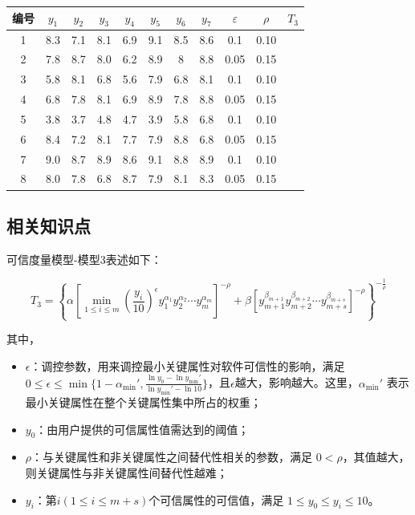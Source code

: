\documentclass{article}
\begin{document}
\begin{center}
	\begin{tabular}{|c|c|c|c|c|c|c|c|c|c|c|}
		\hline
		编号 & $y_1$ & $y_2$ & $y_3$ & $y_4$ & $y_5$ & $y_6$ & $y_7$ & $\varepsilon$ & $\rho$ & $T_3$ \\ \hline
		1   & 8.3   & 7.1   & 8.1   & 6.9   & 9.1   & 8.5   & 8.6   & 0.1           & 0.10   &       \\ \hline
		2   & 7.8   & 8.7   & 8.0   & 6.2   & 8.9   & 8     & 8.8   & 0.05          & 0.15   &       \\ \hline
		3   & 5.8   & 8.1   & 6.8   & 5.6   & 7.9   & 6.8   & 8.1   & 0.1           & 0.10   &       \\ \hline
		4   & 6.8   & 7.8   & 8.1   & 6.9   & 8.9   & 7.8   & 8.8   & 0.05          & 0.15   &       \\ \hline
		5   & 3.8   & 3.7   & 4.8   & 4.7   & 3.9   & 5.8   & 6.8   & 0.1           & 0.10   &       \\ \hline
		6   & 8.4   & 7.2   & 8.1   & 7.7   & 7.9   & 8.8   & 6.8   & 0.05          & 0.15   &       \\ \hline
		7   & 9.0   & 8.7   & 8.9   & 8.6   & 9.1   & 8.8   & 8.9   & 0.1           & 0.10   &       \\ \hline
		8   & 8.0   & 7.8   & 6.8   & 8.7   & 7.9   & 8.1   & 8.3   & 0.05          & 0.15   &       \\ \hline
	\end{tabular}
\end{center}

\subsection{相关知识点}

可信度量模型-模型3表述如下：

$$
T_3 = \left\{ \alpha \left[ \min_{1 \leq i \leq m} \left( \frac{y_i}{10} \right)^\epsilon y_1^{\alpha_1} y_2^{\alpha_2} \cdots y_m^{\alpha_m} \right]^{-\rho} + \beta \left[ y_{m+1}^{\beta_{m+1}} y_{m+2}^{\beta_{m+2}} \cdots y_{m+s}^{\beta_{m+s}} \right]^{-\rho} \right\}^{-\frac{1}{\rho}}
$$

其中，

\begin{itemize}
	\item $\epsilon$：调控参数，用来调控最小关键属性对软件可信性的影响，满足 $0 \leq \epsilon \leq \min\{1 - \alpha_{\text{min}}', \frac{\ln y_0 - \ln y_{\text{min}}'}{\ln y_{\text{min}}' - \ln 10}\}$，且$\epsilon$越大，影响越大。这里，$\alpha_{\text{min}}'$ 表示最小关键属性在整个关键属性集中所占的权重；
	\item $y_0$：由用户提供的可信属性值需达到的阈值；
	\item $\rho$：与关键属性和非关键属性之间替代性相关的参数，满足 $0 < \rho$，其值越大，则关键属性与非关键属性间替代性越难；
	\item $y_i$：第$i(1 \leq i \leq m + s)$个可信属性的可信值，满足 $1 \leq y_0 \leq y_i \leq 10$。
\end{itemize}
\end{document}
